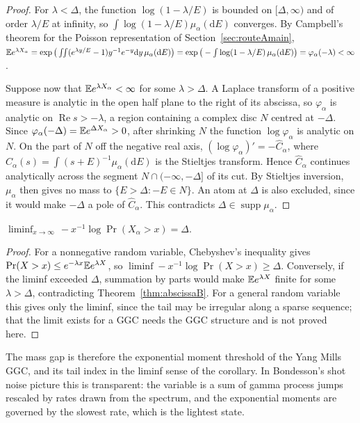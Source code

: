 \begin{proof}
For $\lambda<\Delta$, the function $\log(1-\lambda/E)$ is bounded on $[\Delta,\infty)$ and of order $\lambda/E$ at infinity, so $\int\log(1-\lambda/E)\mu_\alpha(\mathrm dE)$ converges. By Campbell's theorem for the Poisson representation of Section~\ref{sec:routeAmain}, $\mathbb{E} e^{\lambda X_\alpha}=\exp\big(\int\!\!\int(e^{\lambda y/E}-1)y^{-1}e^{-y}\mathrm dy\,\mu_\alpha(\mathrm dE)\big)=\exp\big(-\int\log(1-\lambda/E)\,\mu_\alpha(\mathrm dE)\big)=\varphi_\alpha(-\lambda)<\infty$.

Suppose now that $\mathbb{E} e^{\lambda X_\alpha}<\infty$ for some $\lambda>\Delta$. A Laplace transform of a positive measure is analytic in the open half plane to the right of its abscissa, so $\varphi_\alpha$ is analytic on $\operatorname{Re}s>-\lambda$, a region containing a complex disc $N$ centred at $-\Delta$. Since $\varphi_\alpha(-\Delta)=\mathbb{E} e^{\Delta X_\alpha}>0$, after shrinking $N$ the function $\log\varphi_\alpha$ is analytic on $N$. On the part of $N$ off the negative real axis, $(\log\varphi_\alpha)'=-\widehat C_\alpha$, where $\widehat C_\alpha(s)=\int(s+E)^{-1}\mu_\alpha(\mathrm dE)$ is the Stieltjes transform. Hence $\widehat C_\alpha$ continues analytically across the segment $N\cap(-\infty,-\Delta]$ of its cut. By Stieltjes inversion, $\mu_\alpha$ then gives no mass to $\{E>\Delta:-E\in N\}$. An atom at $\Delta$ is also excluded, since it would make $-\Delta$ a pole of $\widehat C_\alpha$. This contradicts $\Delta\in\operatorname{supp}\mu_\alpha$.
\end{proof}

\begin{corollary}
$\liminf_{x\to\infty}\,-x^{-1}\log\Pr(X_\alpha>x)=\Delta$.
\end{corollary}

\begin{proof}
For a nonnegative random variable, Chebyshev's inequality gives $\Pr(X>x)\le e^{-\lambda x}\mathbb{E} e^{\lambda X}$, so $\liminf-x^{-1}\log\Pr(X>x)\ge\Delta$. Conversely, if the liminf exceeded $\Delta$, summation by parts would make $\mathbb{E} e^{\lambda X}$ finite for some $\lambda>\Delta$, contradicting Theorem~\ref{thm:abscissaB}. For a general random variable this gives only the liminf, since the tail may be irregular along a sparse sequence; that the limit exists for a GGC needs the GGC structure and is not proved here.
\end{proof}

The mass gap is therefore the exponential moment threshold of the Yang Mills GGC, and its tail index in the liminf sense of the corollary. In Bondesson's shot noise picture this is transparent: the variable is a sum of gamma process jumps rescaled by rates drawn from the spectrum, and the exponential moments are governed by the slowest rate, which is the lightest state.

